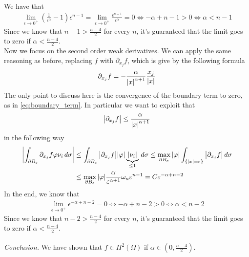 We have that
\[
    \begin{split}
        \lim_{\epsilon \to 0^+} \left(\frac{1}{\epsilon^\alpha}-1\right) \epsilon^{n-1} = \lim_{\epsilon \to 0^+} \frac{\epsilon^{n-1}}{\epsilon^\alpha}  = 0 \iff -\alpha + n - 1 >  0 \iff \alpha < n - 1
    \end{split}
\]
Since we know that $n - 1 > \frac{n-4}{2}$ for every \(n\), it's guaranteed
that the limit goes to zero if \(\alpha < \frac{n-4}{2}\).\\ Now we focus on
the second order weak derivatives. We can apply the same reasoning as before,
replacing \(f\) with \(\partial_{x_j} f\), which is give by the following
formula
\begin{equation*}
    \partial_{x_j} f = -\frac{\alpha}{\abs{x}^{\alpha + 1}} \frac{x_j}{\abs{x}}
\end{equation*}
The only point to discuss here is the convergence of the boundary term to zero, as in \eqref{eq:boundary_term}.
In particular we want to exploit that
\begin{equation*}
    \abs{\partial_{x_j} f} \leq \frac{\alpha}{\abs{x}^{\alpha + 1}}
\end{equation*}
in the following way
\begin{equation*}
    \begin{split}
        \abs{\int_{\partial B_\varepsilon} \partial_{x_j} f \varphi \nu_i \, d\sigma} & \leq \int_{\partial B_\varepsilon} \abs{\partial_{x_j} f} \abs{\varphi} \underbrace{\abs{\nu_i}}_{\leq 1} \, d\sigma \leq \max_{\partial B_\varepsilon} \abs{\varphi} \int_{\{ \abs{x} = \varepsilon \}} \abs{\partial_{x_j} f} \, d\sigma \\
                                                                                & \leq \max_{\partial B_\varepsilon} \abs{\varphi} \frac{\alpha}{\varepsilon^{\alpha+1}} \omega_n \varepsilon^{n-1} = C \varepsilon^{-\alpha + n - 2}
    \end{split}
\end{equation*}
In the end, we know that
\[
    \begin{split}
        \lim_{\epsilon \to 0^+} \epsilon^{-\alpha + n - 2} = 0 \iff -\alpha + n - 2 >  0 \iff \alpha < n - 2
    \end{split}
\]
Since we know that $n - 2 > \frac{n-4}{2}$ for every \(n\), it's guaranteed
that the limit goes to zero if \(\alpha < \frac{n-4}{2}\).\\ \vspace{0.1cm}\\
\textit{Conclusion.} We have shown that \(f \in H^2(\Omega)\) if \(\alpha \in
\left(0, \frac{n-4}{2}\right)\).

